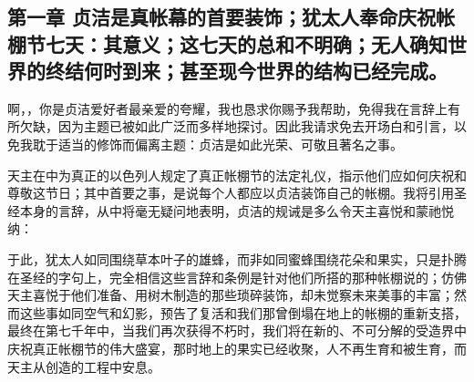 

\section{}

\par


\subsection{第一章  贞洁是真帐幕的首要装饰；犹太人奉命庆祝帐棚节七天：其意义；这七天的总和不明确；无人确知世界的终结何时到来；甚至现今世界的结构已经完成。}

啊，，你是贞洁爱好者最亲爱的夸耀，我也恳求你赐予我帮助，免得我在言辞上有所欠缺，因为主题已被如此广泛而多样地探讨。因此我请求免去开场白和引言，以免我耽于适当的修饰而偏离主题：贞洁是如此光荣、可敬且著名之事。\par

天主在中为真正的以色列人规定了真正帐棚节的法定礼仪，指示他们应如何庆祝和尊敬这节日；其中首要之事，是说每个人都应以贞洁装饰自己的帐棚。我将引用圣经本身的言辞，从中将毫无疑问地表明，贞洁的规诫是多么令天主喜悦和蒙祂悦纳： \par

于此，犹太人如同围绕草本叶子的雄蜂，而非如同蜜蜂围绕花朵和果实，只是扑腾在圣经的字句上，完全相信这些言辞和条例是针对他们所搭的那种帐棚说的；仿佛天主喜悦于他们准备、用树木制造的那些琐碎装饰，却未觉察未来美事的丰富；然而这些事如同空气和幻影，预告了复活和我们那曾倒塌在地上的帐棚的重新支搭，最终在第七千年中，当我们再次获得不朽时，我们将在新的、不可分解的受造界中庆祝真正帐棚节的伟大盛宴，那时地上的果实已经收聚，人不再生育和被生育，而天主从创造的工程中安息。\par

